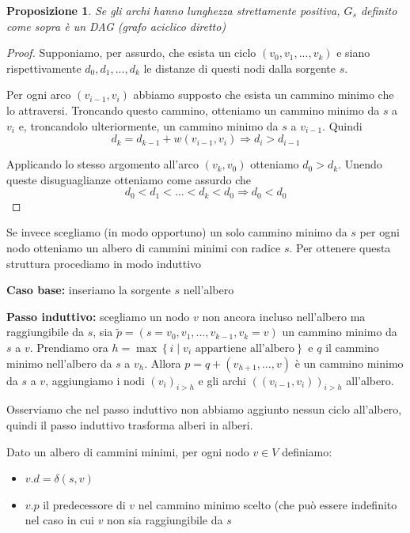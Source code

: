 \documentclass[a4paper,10pt]{amsbook}
\newcounter{counter1}
\theoremstyle{plain}
\newtheorem{mypro}[counter1]{Proposizione}
\theoremstyle{definition}
\theoremstyle{remark}
\newcommand{\set}[1]{\left\{#1\right\}}
\newcommand{\pa}[1]{\left(#1\right)}
\begin{document}
\begin{mypro}
\label{pro:DAG}
  Se gli archi hanno lunghezza strettamente positiva, $G_s$ definito
  come sopra è un DAG (grafo aciclico diretto)
\end{mypro}
\begin{proof}
  Supponiamo, per assurdo, che esista un ciclo $(v_0,v_1,...,v_k)$ e
  siano rispettivamente $d_0,d_1,...,d_k$ le distanze di questi nodi
  dalla sorgente $s$.

  Per ogni arco $(v_{i-1},v_i)$ abbiamo supposto che esista un cammino
  minimo che lo attraversi. Troncando questo cammino, otteniamo un
  cammino minimo da $s$ a $v_i$ e, troncandolo ulteriormente, un
  cammino minimo da $s$ a $v_{i-1}$. Quindi
  \[ d_k = d_{k-1} + w\pa{ v_{i-1} , v_i  } \Rightarrow d_i >
  d_{i-1} \]
  
  Applicando lo stesso argomento all'arco $(v_k,v_0)$ otteniamo $d_0 >
  d_k$. Unendo queste disuguaglianze otteniamo come assurdo che
  \[ d_0 < d_1 < \dots < d_k < d_0 \Rightarrow d_0 < d_0 \]
\end{proof}

Se invece scegliamo (in modo opportuno) un solo cammino minimo da $s$
per ogni nodo otteniamo un albero di cammini minimi con radice
$s$. Per ottenere questa struttura procediamo in modo induttivo

\textbf{Caso base:} inseriamo la sorgente $s$ nell'albero

\textbf{Passo induttivo:} scegliamo un nodo $v$ non ancora incluso
nell'albero ma raggiungibile da $s$, sia $\tilde p = (s=v_0,v_1,...,
v_{k-1}, v_k=v)$ un cammino minimo da $s$ a $v$. Prendiamo ora $h =
\max\set{ i \mid v_i \text{ appartiene all'albero}}$ e $q$ il cammino
minimo nell'albero da $s$ a $v_h$. Allora $p = q + (v_{h+1}, \dots ,
v)$ è un cammino minimo da $s$ a $v$, aggiungiamo i nodi $\pa{ v_i }
_{i>h}$ e gli archi $\pa{(v_{i-1},v_i)}_{i>h}$ all'albero.

Osserviamo che nel passo induttivo non abbiamo aggiunto nessun ciclo
all'albero, quindi il passo induttivo trasforma alberi in alberi.

Dato un albero di cammini minimi, per ogni nodo $v\in V$ definiamo:
\begin{itemize}
\item $v.d = \delta(s,v)$
\item $v.p$ il predecessore di $v$ nel cammino minimo scelto (che può
  essere indefinito nel caso in cui $v$ non sia raggiungibile da $s$
\end{itemize}
\end{document}
